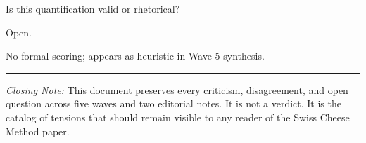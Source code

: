 \documentclass[11pt,letterpaper]{article}
\begin{document}
\begin{reflist}
\item[Dispute:] Is this quantification valid or rhetorical?
\item[Status:] Open.
\item[Evidence:] No formal scoring; appears as heuristic in Wave 5 synthesis.
\end{reflist}

\vspace{2em}
\begin{center}\rule{0.5\textwidth}{0.4pt}\end{center}
\vspace{1em}

\noindent\textit{Closing Note:} This document preserves every criticism, disagreement, and open question across five waves and two editorial notes. It is not a verdict. It is the catalog of tensions that should remain visible to any reader of the Swiss Cheese Method paper.
\end{document}
